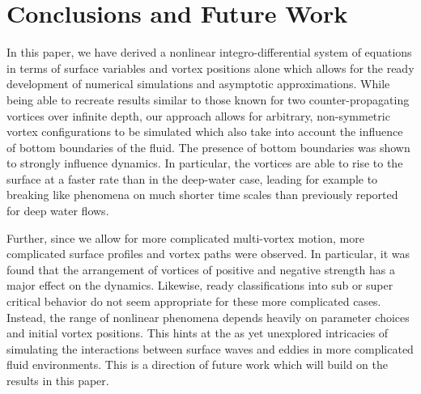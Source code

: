\documentclass[a4paper,11pt]{article}
\begin{document}
\section{Conclusions and Future Work}
In this paper, we have derived a nonlinear integro-differential system of equations in terms of surface variables and vortex positions alone which allows for the ready development of numerical simulations and asymptotic approximations.  While being able to recreate results similar to those known for two counter-propagating vortices over infinite depth, our approach allows for arbitrary, non-symmetric vortex configurations to be simulated which also take into account the influence of bottom boundaries of the fluid. The presence of bottom boundaries was shown to strongly influence dynamics.  In particular, the vortices are able to rise to the surface at a faster rate than in the deep-water case, leading for example to breaking like phenomena on much shorter time scales than previously reported for deep water flows.  

Further, since we allow for more complicated multi-vortex motion, more complicated surface profiles and vortex paths were observed. In particular, it was found that the arrangement of vortices of positive and negative strength has a major effect on the dynamics.  Likewise, ready classifications into sub or super critical behavior do not seem appropriate for these more complicated cases.  Instead, the range of nonlinear phenomena depends heavily on parameter choices and initial vortex positions.  This hints at the as yet unexplored intricacies of simulating the interactions between surface waves and eddies in more complicated fluid environments.  This is a direction of future work which will build on the results in this paper. \\\\

\end{document}
